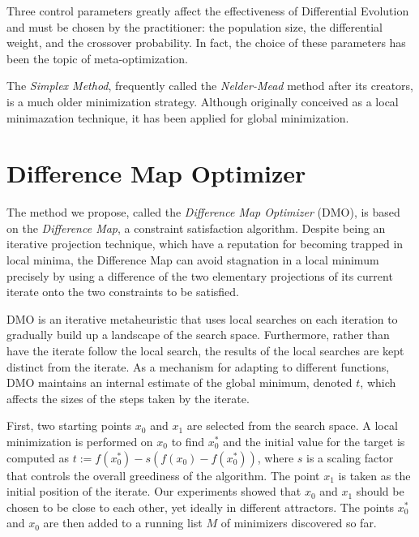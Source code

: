 \documentclass[12pt]{article}
\begin{document}
    Three control parameters greatly affect the effectiveness of Differential
    Evolution and must be chosen by the practitioner\cite{storn1997}: the
    population size, the differential weight, and the crossover probability.
    In fact, the choice of these parameters has been the topic of
    meta-optimization\cite{pedersen2010}.

    The \emph{Simplex Method}\cite{nelder1965}, frequently called the
    \emph{Nelder-Mead} method after its creators, is a much older minimization
    strategy. Although originally conceived as a local minimazation technique,
    it has been applied for global minimization.

\section{Difference Map Optimizer}
    The method we propose, called the \emph{Difference Map Optimizer} (DMO), is
    based on the \emph{Difference Map}\cite{elser2007}, a constraint
    satisfaction algorithm.
    Despite being an iterative projection technique, which have a reputation
    for becoming trapped in local minima, the Difference Map can avoid
    stagnation in a local minimum precisely by using a difference of the two
    elementary projections of its current iterate onto the two constraints to
    be satisfied.

    DMO is an iterative metaheuristic that uses local searches on each
    iteration to gradually build up a landscape of the search space.
    Furthermore, rather than have the iterate follow the local search, the
    results of the local searches are kept distinct from the iterate.
    As a mechanism for adapting to different functions, DMO maintains an
    internal estimate of the global minimum, denoted $t$, which affects the
    sizes of the steps taken by the iterate.

    First, two starting points $x_0$ and $x_1$ are selected from the search
    space.
    A local minimization is performed on $x_0$ to find $x_0^*$ and the
    initial value for the target is computed as
    $t := f(x_0^*) - s (f(x_0) - f(x_0^*))$,
    where $s$ is a scaling factor that controls the overall greediness of the
    algorithm.
    The point $x_1$ is taken as the initial position of the iterate. Our
    experiments showed that $x_0$ and $x_1$ should be chosen to be close to
    each other, yet ideally in different attractors.
    The points $x_0^*$ and $x_0$ are then added to a running list $M$ of
    minimizers discovered so far.
\end{document}
